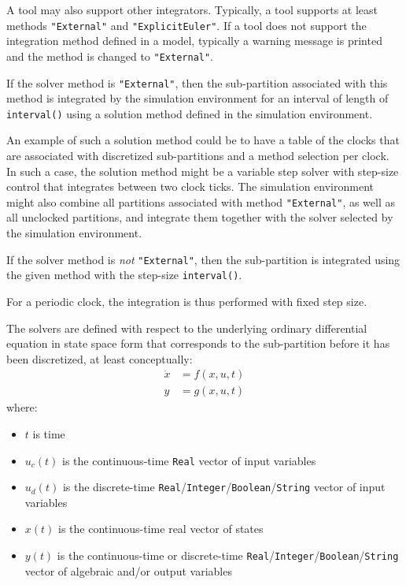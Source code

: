 \begin{nonnormative}
A tool may also support other integrators.
Typically, a tool supports at least methods \lstinline!"External"! and \lstinline!"ExplicitEuler"!.
If a tool does not support the integration method defined in a model, typically a warning message is printed and the method is changed to \lstinline!"External"!.
\end{nonnormative}

If the solver method is \lstinline!"External"!, then the sub-partition associated with this method is integrated by the simulation environment for an interval of length of \lstinline!interval()! using a solution method defined in the simulation environment.

\begin{nonnormative}
An example of such a solution method could be to have a table of the clocks that are associated with discretized sub-partitions and a method selection per clock.
In such a case, the solution method might be a variable step solver with step-size control that integrates between two clock ticks.
The simulation environment might also combine all partitions associated with method \lstinline!"External"!, as well as all unclocked partitions, and integrate them together with the solver selected by the simulation environment.
\end{nonnormative}

If the solver method is \emph{not} \lstinline!"External"!, then the sub-partition is integrated using the given method with the step-size \lstinline!interval()!.

\begin{nonnormative}
For a periodic clock, the integration is thus performed with fixed step size.
\end{nonnormative}

The solvers are defined with respect to the underlying ordinary differential equation in state space form that corresponds to the sub-partition before it has been discretized, at least conceptually:
\begin{align*}
\dot{x} &= f(x, u, t)\\
y &= g(x, u, t)
\end{align*}
where:
\begin{itemize}
\item $t$ is time
\item $u_{c}(t)$ is the continuous-time \lstinline!Real! vector of input variables
\item $u_{d}(t)$ is the discrete-time \lstinline!Real!/\lstinline!Integer!/\lstinline!Boolean!/\lstinline!String! vector of input variables
\item $x(t)$ is the continuous-time real vector of states
\item $y(t)$ is the continuous-time or discrete-time \lstinline!Real!/\lstinline!Integer!/\lstinline!Boolean!/\lstinline!String! vector of algebraic and/or output variables
\end{itemize}

